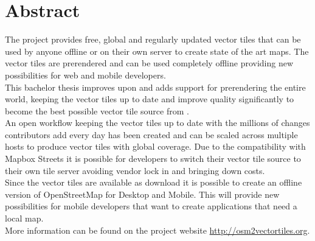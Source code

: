 

\begingroup
\let\clearpage\relax
\let\cleardoublepage\relax
\let\cleardoublepage\relax

\chapter*{Abstract} %

The \osmvt{} project provides free, global and regularly updated vector tiles that can be used by anyone offline or on their own server to create
state of the art maps. The vector tiles are prerendered and can be used completely offline providing new possibilities for web and mobile developers. \\

This bachelor thesis improves upon \osmvt{} and adds support for prerendering the entire world, keeping the vector tiles up to date and improve quality significantly to become the best possible vector tile source from \osm{}. \\  

An open workflow keeping the vector tiles up to date with the millions of changes \osm{} contributors add every day has been created and can be scaled across multiple hosts to produce vector tiles with global coverage.
Due to the compatibility with Mapbox Streets it is possible for developers to switch their vector tile source
to their own tile server avoiding vendor lock in and bringing down costs. \\

Since the  vector tiles are available as download it is possible to create an offline version of OpenStreetMap for Desktop and Mobile. This will provide new possibilities for mobile developers that want to create applications that need a local map.\\

More information can be found on the project website \url{http://osm2vectortiles.org}.

\endgroup			
